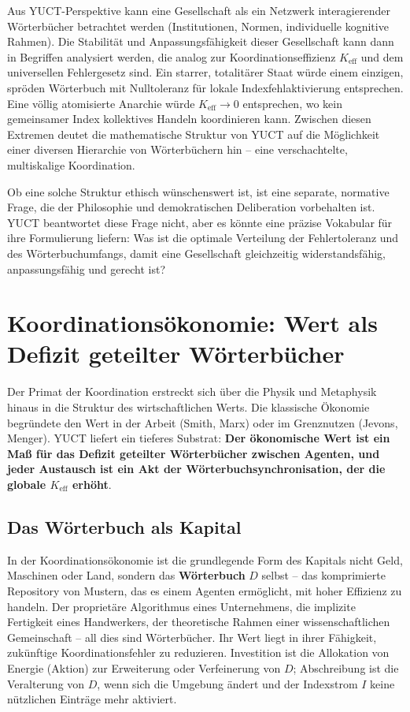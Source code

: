 \documentclass[12pt,a4paper]{article}
\begin{document}
	Aus YUCT-Perspektive kann eine Gesellschaft als ein Netzwerk interagierender Wörterbücher betrachtet werden (Institutionen, Normen, individuelle kognitive Rahmen). Die Stabilität und Anpassungsfähigkeit dieser Gesellschaft kann dann in Begriffen analysiert werden, die analog zur Koordinationseffizienz \(K_{\mathrm{eff}}\) und dem universellen Fehlergesetz sind. Ein starrer, totalitärer Staat würde einem einzigen, spröden Wörterbuch mit Nulltoleranz für lokale Indexfehlaktivierung entsprechen. Eine völlig atomisierte Anarchie würde \(K_{\mathrm{eff}} \to 0\) entsprechen, wo kein gemeinsamer Index kollektives Handeln koordinieren kann. Zwischen diesen Extremen deutet die mathematische Struktur von YUCT auf die Möglichkeit einer diversen Hierarchie von Wörterbüchern hin – eine verschachtelte, multiskalige Koordination.
	
	Ob eine solche Struktur ethisch wünschenswert ist, ist eine separate, normative Frage, die der Philosophie und demokratischen Deliberation vorbehalten ist. YUCT beantwortet diese Frage nicht, aber es könnte eine präzise Vokabular für ihre Formulierung liefern: Was ist die optimale Verteilung der Fehlertoleranz und des Wörterbuchumfangs, damit eine Gesellschaft gleichzeitig widerstandsfähig, anpassungsfähig und gerecht ist?
	
	\section{Koordinationsökonomie: Wert als Defizit geteilter Wörterbücher}
	\label{sec:coordination-economics}
	
	Der Primat der Koordination erstreckt sich über die Physik und Metaphysik hinaus in die Struktur des wirtschaftlichen Werts. Die klassische Ökonomie begründete den Wert in der Arbeit (Smith, Marx) oder im Grenznutzen (Jevons, Menger). YUCT liefert ein tieferes Substrat: \textbf{Der ökonomische Wert ist ein Maß für das Defizit geteilter Wörterbücher zwischen Agenten, und jeder Austausch ist ein Akt der Wörterbuchsynchronisation, der die globale \(K_{\mathrm{eff}}\) erhöht}.

\subsection{Das Wörterbuch als Kapital}

In der Koordinationsökonomie ist die grundlegende Form des Kapitals nicht Geld, Maschinen oder Land, sondern das \textbf{Wörterbuch} \(D\) selbst – das komprimierte Repository von Mustern, das es einem Agenten ermöglicht, mit hoher Effizienz zu handeln. Der proprietäre Algorithmus eines Unternehmens, die implizite Fertigkeit eines Handwerkers, der theoretische Rahmen einer wissenschaftlichen Gemeinschaft – all dies sind Wörterbücher. Ihr Wert liegt in ihrer Fähigkeit, zukünftige Koordinationsfehler zu reduzieren. Investition ist die Allokation von Energie (Aktion) zur Erweiterung oder Verfeinerung von \(D\); Abschreibung ist die Veralterung von \(D\), wenn sich die Umgebung ändert und der Indexstrom \(I\) keine nützlichen Einträge mehr aktiviert.
\end{document}
